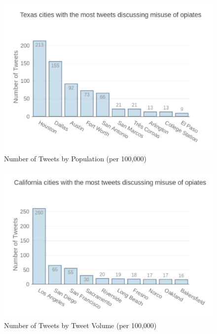 \documentclass[sigconf]{acmart}
\begin{document}
\begin{figure}[!ht]
  \centering\includegraphics[width=\columnwidth]{images/Figure1.pdf}
  \caption{Number of Tweets by Population (per 100,000)}
  \label{f:Figure1}
\end{figure}

\begin{figure}[!ht]
  \centering\includegraphics[width=\columnwidth]{images/Figure2.pdf}
  \caption{Number of Tweets by Tweet Volume (per 100,000)}
  \label{f:Figure2}
\end{figure}
\end{document}
